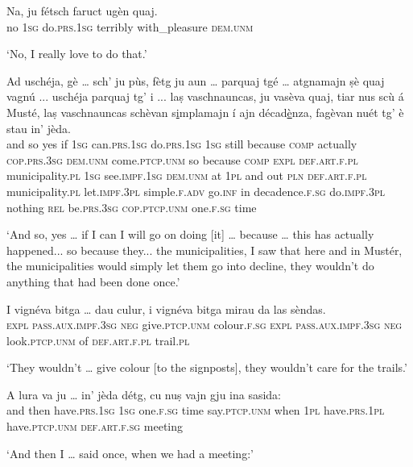 \begin{linenumbers}
\gll Na, ju fétsch faruct ugèn quaj.   \\
no \textsc{1sg} do.\textsc{prs.1sg} terribly with\_pleasure \textsc{dem.unm} \\
\end{linenumbers}
\medskip
\glt `No, I really love to do that.'
\medskip

\begin{linenumbers}
\gll  Ad uschéja, gè … sch’ ju pùs, fètg ju aun … parquaj tgé … atgnamajn ṣè quaj vagnú ... uschéja parquaj tg' i ... laṣ vaschnauncas, ju vasèva quaj, tiar nus scù á Musté, laṣ vaschnauncas schèvan s\underline{i}mplamajn í ajn décad\underline{è}nza, fagèvan nuét tg’ è stau in’ jèda.  \\
and so yes {} if \textsc{1sg} can.\textsc{prs.1sg} do.\textsc{prs.1sg} \textsc{1sg} still {} because \textsc{comp} {} actually \textsc{cop.prs.3sg} \textsc{dem.unm}  come.\textsc{ptcp.unm} {} so because \textsc{comp} \textsc{expl} {} \textsc{def.art.f.pl} municipality.\textsc{pl} \textsc{1sg} see.\textsc{impf.1sg} \textsc{dem.unm} at \textsc{1pl} and out \textsc{pln} \textsc{def.art.f.pl} municipality.\textsc{pl} let.\textsc{impf.3pl} simple.\textsc{f.adv}  go.\textsc{inf} in decadence.\textsc{f.sg} do.\textsc{impf.3pl} nothing \textsc{rel} be.\textsc{prs.3sg} \textsc{cop.ptcp.unm} one.\textsc{f.sg} time\\
\end{linenumbers}
\medskip
\glt `And so, yes … if I can I will go on doing [it] … because … this has actually happened... so because they... the municipalities, I saw that here and in Mustér, the municipalities would simply let them go into decline, they wouldn’t do anything that had been done once.'
\medskip

\begin{linenumbers}
\gll I vignéva bitga … dau culur, i vignéva bitga mirau da las sèndas.   \\
 \textsc{expl} \textsc{pass.aux.impf.3sg} \textsc{neg} {} give.\textsc{ptcp.unm}  colour.\textsc{f.sg} \textsc{expl} \textsc{pass.aux.impf.3sg} \textsc{neg}  look.\textsc{ptcp.unm} of  \textsc{def.art.f.pl} trail.\textsc{pl}\\
\end{linenumbers}
\medskip
\glt `They wouldn’t … give colour [to the signposts], they wouldn’t care for the trails.'\medskip

\begin{linenumbers}
\gll  A lura va ju … in’ jèda détg, cu nuṣ vajn gju ina sasida:  \\
and then have.\textsc{prs.1sg} \textsc{1sg} {} one.\textsc{f.sg} time say.\textsc{ptcp.unm} when \textsc{1pl} have.\textsc{prs.1pl} have.\textsc{ptcp.unm} \textsc{def.art.f.sg} meeting  \\
\end{linenumbers}
\medskip
\glt `And then I … said once, when we had a meeting:'
\medskip

